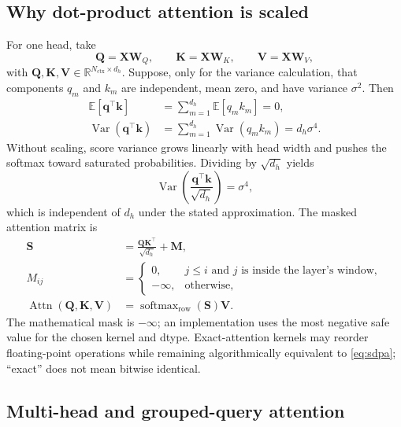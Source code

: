 \documentclass[10pt,letterpaper]{article}
\newcommand{\R}{\mathbb{R}}
\newcommand{\E}{\mathbb{E}}
\newcommand{\1}{\mathbb{1}}
\newcommand{\vect}[1]{\bm{#1}}
\newcommand{\mat}[1]{\bm{#1}}
\newcommand{\softmax}{\operatorname{softmax}}
\begin{document}
\subsection{Why dot-product attention is scaled}

For one head, take
\begin{equation}
  \mat Q=\mat X\mat W_Q,\qquad
  \mat K=\mat X\mat W_K,\qquad
  \mat V=\mat X\mat W_V,
  \label{eq:qkv}
\end{equation}
with $\mat Q,\mat K,\mat V\in\R^{N_{\mathrm{ctx}}\times d_h}$.  Suppose, only for the
variance calculation, that components $q_m$ and $k_m$ are independent, mean zero, and have variance
$\sigma^2$.  Then
\begin{align}
  \E[\vect q^\top\vect k]
  &=\sum_{m=1}^{d_h}\E[q_mk_m]=0,\\
  \operatorname{Var}(\vect q^\top\vect k)
  &=\sum_{m=1}^{d_h}\operatorname{Var}(q_mk_m)
    =d_h\sigma^4.
  \label{eq:dot-var}
\end{align}
Without scaling, score variance grows linearly with head width and pushes the softmax toward saturated
probabilities.  Dividing by $\sqrt{d_h}$ yields
\begin{equation}
  \operatorname{Var}\!\left(\frac{\vect q^\top\vect k}{\sqrt{d_h}}\right)=\sigma^4,
  \label{eq:scaled-var}
\end{equation}
which is independent of $d_h$ under the stated approximation.  The masked attention matrix is
\begin{align}
  \mat S &= \frac{\mat Q\mat K^\top}{\sqrt{d_h}}+\mat M,\\
  M_{ij} &=
  \begin{cases}
    0, & j\le i\text{ and }j\text{ is inside the layer's window},\\
    -\infty, & \text{otherwise},
  \end{cases}\\
  \operatorname{Attn}(\mat Q,\mat K,\mat V)
  &=\softmax_{\mathrm{row}}(\mat S)\mat V.
  \label{eq:sdpa}
\end{align}
The mathematical mask is $-\infty$; an implementation uses the most negative safe value for the
chosen kernel and dtype.  Exact-attention kernels may reorder floating-point operations while
remaining algorithmically equivalent to \cref{eq:sdpa}; ``exact'' does not mean bitwise identical.

\subsection{Multi-head and grouped-query attention}
\end{document}
